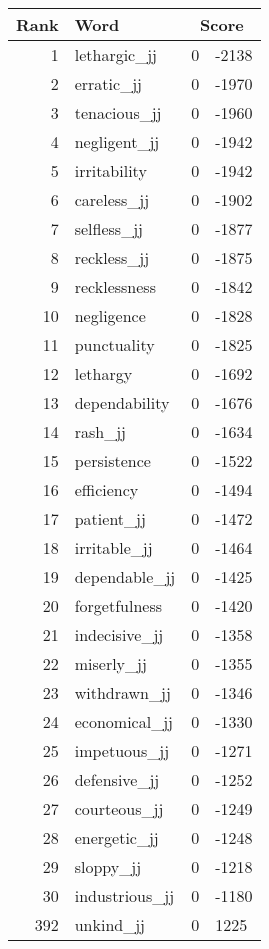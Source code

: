 \begin{longtable}[!htbp]{| rlr@{.}l |}
    \hline
    \textbf{Rank} & \textbf{Word} & \multicolumn{2}{c|}{\textbf{Score}} \\
    \hline
    \endhead
    1 & lethargic\_jj & 0 & -2138 \\
    2 & erratic\_jj & 0 & -1970 \\
    3 & tenacious\_jj & 0 & -1960 \\
    4 & negligent\_jj & 0 & -1942 \\
    5 & irritability & 0 & -1942 \\
    6 & careless\_jj & 0 & -1902 \\
    7 & selfless\_jj & 0 & -1877 \\
    8 & reckless\_jj & 0 & -1875 \\
    9 & recklessness & 0 & -1842 \\
    10 & negligence & 0 & -1828 \\
    11 & punctuality & 0 & -1825 \\
    12 & lethargy & 0 & -1692 \\
    13 & dependability & 0 & -1676 \\
    14 & rash\_jj & 0 & -1634 \\
    15 & persistence & 0 & -1522 \\
    16 & efficiency & 0 & -1494 \\
    17 & patient\_jj & 0 & -1472 \\
    18 & irritable\_jj & 0 & -1464 \\
    19 & dependable\_jj & 0 & -1425 \\
    20 & forgetfulness & 0 & -1420 \\
    21 & indecisive\_jj & 0 & -1358 \\
    22 & miserly\_jj & 0 & -1355 \\
    23 & withdrawn\_jj & 0 & -1346 \\
    24 & economical\_jj & 0 & -1330 \\
    25 & impetuous\_jj & 0 & -1271 \\
    26 & defensive\_jj & 0 & -1252 \\
    27 & courteous\_jj & 0 & -1249 \\
    28 & energetic\_jj & 0 & -1248 \\
    29 & sloppy\_jj & 0 & -1218 \\
    30 & industrious\_jj & 0 & -1180 \\
    392 & unkind\_jj & 0 & 1225 \\

\end{longtable}
